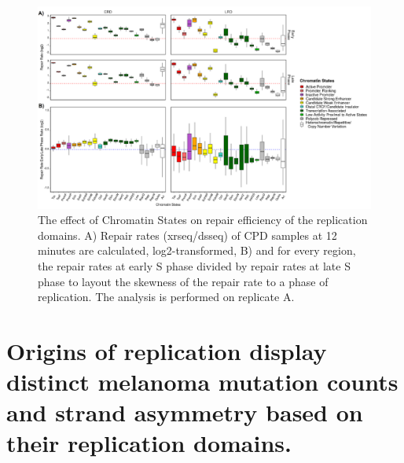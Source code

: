 \begin{figure}[H]
    \begin{center}
    \includegraphics[width=\textwidth]{Chapters/4_results/figures/fig3}
    \caption[The effect of Chromatin States on repair efficiency of the replication domains.]{The effect of Chromatin States on repair efficiency of the replication domains. A) Repair rates (\gls{xrseq}/\gls{dsseq}) of \gls{CPD} samples at 12 minutes are calculated, log2-transformed, B) and for every region, the repair rates at early S phase divided by repair rates at late S phase to layout the skewness of the repair rate to a phase of replication. The analysis is performed on replicate A.}
    \label{fig:chromatin}
    \end{center}
    \end{figure}

\section{Origins of replication display distinct melanoma mutation counts and strand asymmetry based on their replication domains.}

